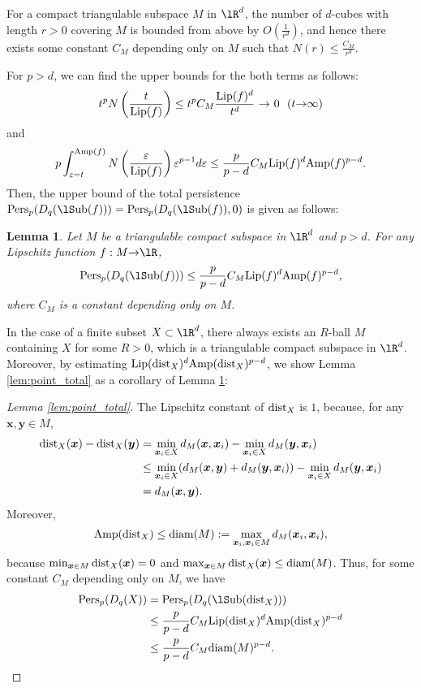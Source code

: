 \documentclass{article}
\newtheorem{lem}[thm]{Lemma}
\newcommand{\ee}{{\varepsilon}}
\newcommand{\ra}{{\rightarrow}}
\newcommand{\Sub}{{\rm {\lS}ub}}
\newcommand{\dist}{{\rm dist}}
\newcommand{\Pers}{{\rm Pers}}
\newcommand{\Lip}{{\rm Lip}}
\newcommand{\Amp}{{\rm Amp}}
\newcommand{\diam}{{\rm diam}}
\providecommand{\pare}[1]{\left( #1 \right)}
\begin{document}
For a compact triangulable subspace $M$ in $\lR^{d}$, the number of $d$-cubes with length $r>0$ covering $M$ is bounded from above by $O(\frac{1}{r^{d}})$, and hence there exists some constant $C_{M}$ depending only on $M$ such that $N(r) \leq \frac{C_{M}}{r^{d}}$.

For $p>d$, we can find the upper bounds for the both terms as follows:
\begin{align*}
t^{p}N\pare{\frac{t}{\Lip(f)}} \leq t^{p}C_{M} \frac{ \Lip(f)^{d}} {t^{d}} \ \ra \ 0 ~~ (t \ra \infty)
\end{align*}
and
\begin{align*}
p \int^{\Amp(f)}_{\ee=t} N\pare{\frac{\ee}{\Lip(f)}} \ee^{p-1}d\ee \leq \frac{p}{p-d} C_{M} \Lip(f)^{d} \Amp(f)^{p-d} .
\end{align*}
Then, the upper bound of the total persistence $\Pers_{p}(D_{q}(\Sub(f)))=\Pers_{p}(D_{q}(\Sub(f)),0)$ is given as follows:
\begin{lem}
\label{lem:total}
Let $M$ be a triangulable compact subspace in $\lR^{d}$ and $p>d$.
For any Lipschitz function $f:M \ra \lR$, 
\[
\Pers_{p}(D_{q}(\Sub(f))) \leq \frac{p}{p-d}C_{M} \Lip(f)^{d} \Amp(f)^{p-d},
\]
where $C_{M}$ is a constant depending only on $M$.
\end{lem}

In the case of a finite subset $X \subset \lR^{d}$, there always exists an $R$-ball $M$ containing $X$ for some $R>0$, which is a triangulable compact subspace in $\lR^{d}$.
Moreover, by estimating $\Lip(\dist_{X})^{d} \Amp(\dist_{X})^{p-d}$, we show Lemma \ref{lem:point_total} as a corollary of Lemma \ref{lem:total}:

\begin{proof}[Lemma \ref{lem:point_total}]
The Lipschitz constant of $\dist_{X}$ is $1$, because, for any $\bm{x},\bm{y} \in M$,
\begin{align*}
\dist_{X}(\bm{x})-\dist_{X}(\bm{y}) 
&=\min_{\bm{x}_{i} \in X} d_{M}(\bm{x},\bm{x}_{i})-\min_{\bm{x}_{i} \in X} d_{M}(\bm{y},\bm{x}_{i}) \\
&\leq \min_{\bm{x}_{i} \in X} (d_{M}(\bm{x},\bm{y})+d_{M}(\bm{y},\bm{x}_{i})) - \min_{\bm{x}_{i} \in X} d_{M}(\bm{y},\bm{x}_{i}) \\
&=d_{M}(\bm{x},\bm{y}).
\end{align*}
Moreover, 
\[
\Amp(\dist_{X}) \leq \diam(M):=\max_{\bm{x}_{i},\bm{x}_{i} \in M} d_{M}(\bm{x}_{i},\bm{x}_{i}),
\]
because $\min_{\bm{x} \in M} \dist_{X}(\bm{x})=0$ and $\max_{\bm{x} \in M} \dist_{X}(\bm{x}) \leq \diam(M)$.
Thus, for some constant $C_{M}$ depending only on $M$,  we have
\begin{align*}
\Pers_{p}(D_{q}(X))
&= \Pers_{p}(D_{q}(\Sub(\dist_{X})))\\
&\leq \frac{p}{p-d}C_{M}\Lip(\dist_{X})^{d} \Amp(\dist_{X})^{p-d} \\
&\leq \frac{p}{p-d}C_{M}\diam(M)^{p-d}.
\end{align*}
\end{proof}
\end{document}
